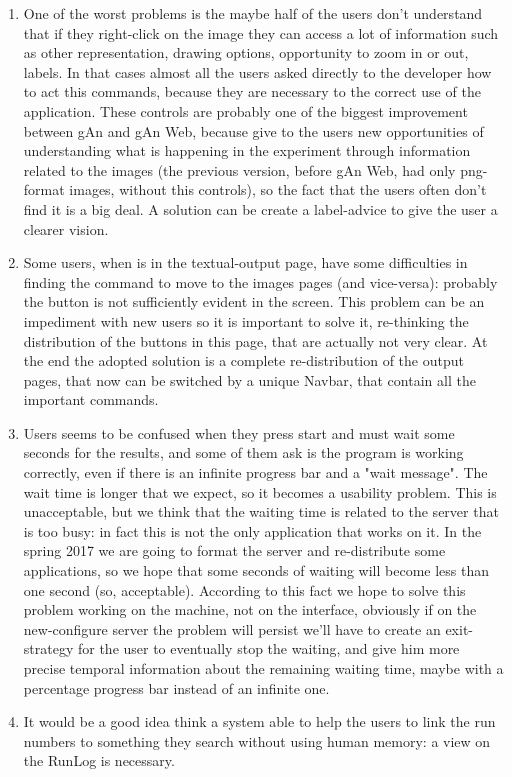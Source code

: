 \begin{enumerate}
\item 
One of the worst problems is the maybe half of the users don't understand that if they right-click on the image they can access a lot of information such as other representation, drawing options, opportunity to zoom in or out, labels. In that cases almost all the users asked directly to the developer how to act this commands, because they are necessary to the correct use of the application. These controls are probably one of the biggest improvement between gAn and gAn Web, because give to the users new opportunities of understanding what is happening in the experiment through information related to the images (the previous version, before gAn Web, had only png-format images, without this controls), so the fact that the users often don't find it is a big deal. A solution can be create a label-advice to give the user a clearer vision.

\item
Some users, when is in the textual-output page, have some difficulties in finding the command to move to the images pages (and vice-versa): probably the button is not sufficiently evident in the screen. This problem can be an impediment with new users so it is important to solve it, re-thinking the distribution of the buttons in this page, that are actually not very clear. At the end the adopted solution is a complete re-distribution of the output pages, that now can be switched by a unique Navbar, that contain all the important commands.

\item
Users seems to be confused when they press start and must wait some seconds for the results, and some of them ask is the program is working correctly, even if there is an infinite progress bar and a "wait message". The wait time is longer that we expect, so it becomes a usability problem. This is unacceptable, but we think that the waiting time is related to the server that is too busy: in fact this is not the only application that works on it. In the spring 2017 we are going to format the server and re-distribute some applications, so we hope that some seconds of waiting will become less than one second (so, acceptable). According to this fact we hope to solve this problem working on the machine, not on the interface, obviously if on the new-configure server the problem will persist we'll have to create an exit-strategy for the user to eventually stop the waiting, and give him more precise temporal information about the remaining waiting time, maybe with a percentage progress bar instead of an infinite one.

\item 
It would be a good idea think a system able to help the users to link the run numbers to something they search without using human memory: a view on the RunLog is necessary.

\end{enumerate}

